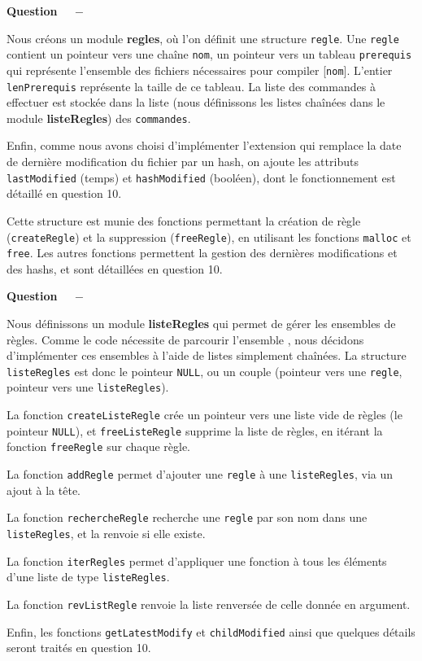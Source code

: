 \documentclass[11pt]{article}
\newcounter{question}[section]
\newenvironment{question}[1][]{\refstepcounter{question}\par\medskip
   \noindent\textbf{Question~\thequestion ~ $-$} \rmfamily}{}
\begin{document}
\newpage


\begin{question} %

Nous créons un module \textbf{regles}, où l'on définit une structure \texttt{regle}. Une \texttt{regle} contient un pointeur vers une chaîne \texttt{nom}, un pointeur vers un tableau \texttt{prerequis} qui représente l'ensemble des fichiers nécessaires pour compiler [\texttt{nom}]. L'entier \texttt{lenPrerequis} représente la taille de ce tableau. La liste des commandes à effectuer est stockée dans la liste (nous définissons les listes chaînées dans le module \textbf{listeRegles}) des \texttt{commandes}.

Enfin, comme nous avons choisi d'implémenter l'extension qui remplace la date de dernière modification du fichier par un hash, on ajoute les attributs \texttt{lastModified} (temps) et \texttt{hashModified} (booléen), dont le fonctionnement est détaillé en question 10.


Cette structure est munie des fonctions permettant la création de règle (\texttt{createRegle}) et la suppression (\texttt{freeRegle}), en utilisant les fonctions \texttt{malloc} et \texttt{free}. Les autres fonctions permettent la gestion des dernières modifications et des hashs, et sont détaillées en question 10.

\end{question}

\begin{question} %

Nous définissons un module \textbf{listeRegles} qui permet de gérer les ensembles de règles. Comme le code nécessite de parcourir l'ensemble , nous décidons d'implémenter ces ensembles à l'aide de listes simplement chaînées.
La structure \texttt{listeRegles} est donc le pointeur \texttt{NULL}, ou un couple (pointeur vers une \texttt{regle}, pointeur vers une \texttt{listeRegles}).

La fonction \texttt{createListeRegle} crée un pointeur vers une liste vide de règles (le pointeur \texttt{NULL}), et \texttt{freeListeRegle} supprime la liste de règles, en itérant la fonction \texttt{freeRegle} sur chaque règle.

La fonction \texttt{addRegle} permet d'ajouter une \texttt{regle} à une \texttt{listeRegles}, via un ajout à la tête.

La fonction \texttt{rechercheRegle} recherche une \texttt{regle} par son nom dans une \texttt{listeRegles}, et la renvoie si elle existe.

La fonction \texttt{iterRegles} permet d'appliquer une fonction à tous les éléments d'une liste de type \texttt{listeRegles}. 

La fonction \texttt{revListRegle} renvoie la liste renversée de celle donnée en argument.

Enfin, les fonctions \texttt{getLatestModify} et \texttt{childModified} ainsi que quelques détails seront traités en question 10.



\end{question}
\end{document}
